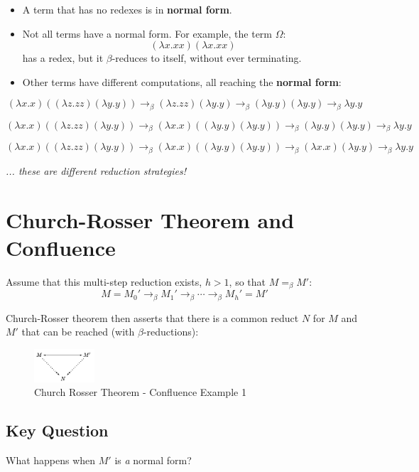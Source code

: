 \documentclass{article}
\begin{document}
\begin{itemize}
    \item A term that has no redexes is in \textbf{normal form}.
    \item Not all terms have a normal form. For example, the term $\Omega$:
    \[
    (\lambda x.xx)(\lambda x.xx)
    \]
    has a redex, but it $\beta$-reduces to itself, without ever terminating.
    \item Other terms have different computations, all reaching the \textbf{normal form}:
\end{itemize}

\[
(\lambda x.x)((\lambda z.zz)(\lambda y.y)) \to_\beta (\lambda z.zz)(\lambda y.y) \to_\beta (\lambda y.y)(\lambda y.y) \to_\beta \lambda y.y
\]

\[
(\lambda x.x)((\lambda z.zz)(\lambda y.y)) \to_\beta (\lambda x.x)((\lambda y.y)(\lambda y.y)) \to_\beta (\lambda y.y)(\lambda y.y) \to_\beta \lambda y.y
\]

\[
(\lambda x.x)((\lambda z.zz)(\lambda y.y)) \to_\beta (\lambda x.x)((\lambda y.y)(\lambda y.y)) \to_\beta (\lambda x.x)(\lambda y.y) \to_\beta \lambda y.y
\]

\textit{... these are different reduction strategies!}

\section*{Church-Rosser Theorem and Confluence}

Assume that this multi-step reduction exists, $h > 1$, so that $M =_\beta M'$:
\[
M = M_0' \to_\beta M_1' \to_\beta \cdots \to_\beta M_h' = M'
\]

Church-Rosser theorem then asserts that there is a common reduct $N$ for $M$ and $M'$ that can be reached (with $\beta$-reductions):

\begin{figure}[ht]
    \centering
    \includegraphics[width=0.2\textwidth]{img/CR_theorem_diagram_0.jpg} %
    \caption{Church Rosser Theorem - Confluence Example 1}
    \label{fig:cr-diagram-1}
\end{figure}

\subsection*{Key Question}
What happens when $M'$ is \emph{a} normal form?
    
\end{document}
